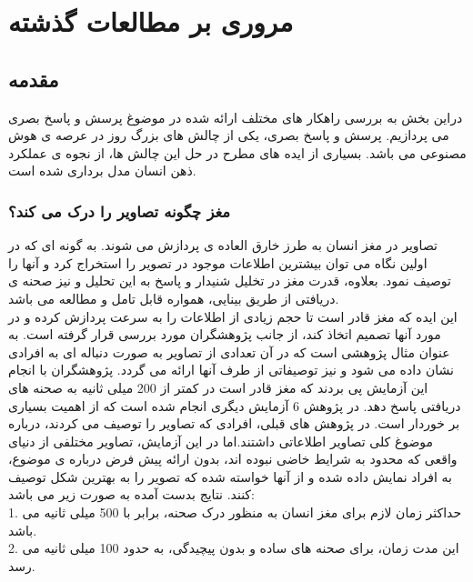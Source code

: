 \chapter{مروری بر مطالعات گذشته}
\section{مقدمه}
دراین بخش به بررسی راهکار های مختلف ارائه شده در موضوغ پرسش و پاسخ بصری می پردازیم. پرسش و پاسخ بصری، یکی از چالش های بزرگ روز در عرصه ی هوش مصنوعی می باشد. بسیاری از ایده های مطرح در حل این چالش ها، از نجوه ی عملکرد ذهن انسان مدل برداری شده است.
\subsection{مغز چگونه تصاویر را درک می کند؟}
تصاویر در مغز انسان به طرز خارق العاده ی پردازش می شوند. به گونه ای که در اولین نگاه می توان بیشترین اطلاعات موجود در تصویر را استخراج کرد و آنها را توصیف نمود. بعلاوه، قدرت مغز در تخلیل شنیدار و پاسخ به این تحلیل و نیز صحنه ی دریافتی از طریق بینایی، همواره قابل تامل و مطالعه می باشد.\\
این ایده که مغز قادر است تا حجم زیادی از اطلاعات را به سرعت پردازش کرده و در مورد آنها تصمیم اتخاذ کند، از جانب پژوهشگران مورد بررسی قرار گرفته است. به عنوان مثال \cite{potter1976short} پژوهشی است که در آن تعدادی از تصاویر به صورت دنباله ای به افرادی نشان داده می شود و نیز توصیفاتی از طرف آنها ارائه می گردد. پژوهشگران با انجام این آزمایش پی بردند که مغز قادر است در کمتر از 200 میلی ثانیه به صحنه های دریافتی پاسخ دهد.
در پژوهش 6 آزمایش دیگری انجام شده است که از اهمیت بسیاری بر خوردار است. در پژوهش های قبلی، افرادی که تصاویر را توصیف می کردند، درباره موضوغ کلی تصاویر اطلاعاتی داشتند.اما در این آزمایش، تصاویر مختلفی از دنیای واقعی که محدود به شرایط خاضی نبوده اند، بدون ارائه پیش فرض درباره ی موضوع، به افراد نمایش داده شده و از آنها خواسته شده که تصویر را به بهترین شکل توصیف کنند. نتایج بدست آمده به صورت زیر می باشد:\\
1. حداکثر زمان لازم برای مغز انسان به منظور درک صحنه، برابر با 500 میلی ثانیه می باشد.\\
2. این مدت زمان، برای صحنه های ساده و بدون پیچیدگی، به حدود 100 میلی ثانیه می رسد.\\
 
